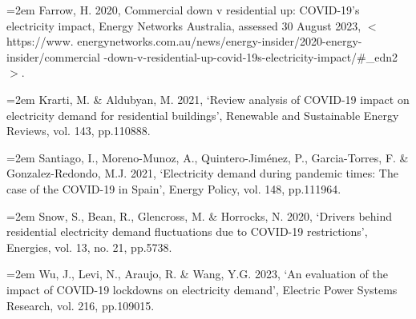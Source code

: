 \documentclass[mstat,12pt]{unswthesis}
\begin{document}
\hangindent=2em
\noindent Farrow, H. 2020, Commercial down v residential up: COVID-19’s electricity impact, Energy Networks Australia, assessed 30 August 2023, $<$https://www. energynetworks.com.au/news/energy-insider/2020-energy-insider/commercial -down-v-residential-up-covid-19s-electricity-impact/\#\_edn2$>$. \hfill\break

\hangindent=2em
\noindent Krarti, M. \& Aldubyan, M. 2021, ‘Review analysis of COVID-19 impact on electricity demand for residential buildings’, Renewable and Sustainable Energy Reviews, vol. 143, pp.110888. \hfill\break

\hangindent=2em
\noindent Santiago, I., Moreno-Munoz, A., Quintero-Jiménez, P., Garcia-Torres, F. \& Gonzalez-Redondo, M.J. 2021, ‘Electricity demand during pandemic times: The case of the COVID-19 in Spain’, Energy Policy, vol. 148, pp.111964. \hfill\break

\hangindent=2em
\noindent Snow, S., Bean, R., Glencross, M. \& Horrocks, N. 2020, ‘Drivers behind residential electricity demand fluctuations due to COVID-19 restrictions’, Energies, vol. 13, no. 21, pp.5738. \hfill\break

\hangindent=2em
\noindent Wu, J., Levi, N., Araujo, R. \& Wang, Y.G. 2023, ‘An evaluation of the impact of COVID-19 lockdowns on electricity demand’, Electric Power Systems Research, vol. 216, pp.109015. \hfill\break
\end{document}
